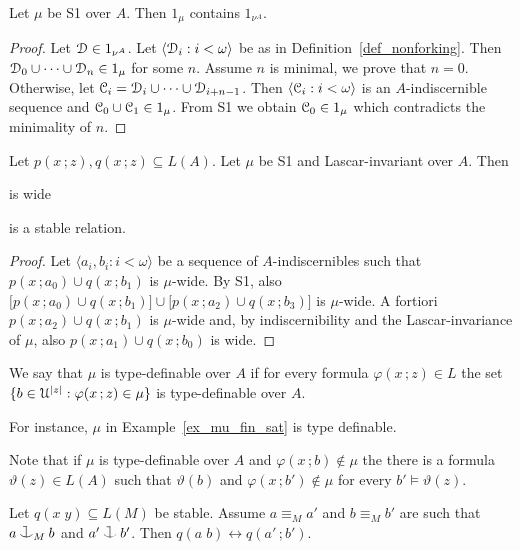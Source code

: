 \documentclass{amsproc}
\def\cnonfork{\mathbin{\raise1.8ex\rlap{\kern0.6ex\rule{0.6ex}{0.1ex}}\rlap{\kern1.1ex\rule{0.1ex}{1.9ex}}\raise-0.3ex\hbox{$\smile$} } }
\begin{document}
\begin{fact}
  Let $\mu$ be S1 over $A$.
  Then $1_\mu$ contains $1_{\nu^A}$.
\end{fact}

\begin{proof}
  Let $\EuScript D\in 1_{\nu^A}$. 
  Let $\langle \EuScript D_i:i<\omega\rangle$ be as in Definition~\ref{def_nonforking}.
  Then $\EuScript D_0\cup\dots\cup\EuScript D_n\in1_\mu$ for some $n$.
  Assume $n$ is minimal, we prove that $n=0$.
  Otherwise, let $\EuScript C_i=\EuScript D_i\cup\dots\cup\EuScript D_{i+n-1}$.
  Then $\langle \EuScript C_i:i<\omega\rangle$ is an $A$-indiscernible sequence and $\EuScript C_0\cup\EuScript C_1\in1_\mu$.
  From S1 we obtain $\EuScript C_0\in1_\mu$ which contradicts the minimality of $n$.
\end{proof}

\begin{theorem}
  Let $p(x\,;z), q(x\,;z)\subseteq L(A)$.
  Let $\mu$ be S1 and Lascar-invariant over $A$.
  Then 

   is wide

  is a stable relation.
\end{theorem}

\begin{proof}
  Let $\langle a_i,b_i: i<\omega\rangle$ be a sequence of $A$-indiscernibles such that $p(x\,;a_0)\cup q(x\,;b_1)$ is $\mu$-wide.
  By S1, also $\big[p(x\,;a_0)\cup q(x\,;b_1)\big]\cup\big[p(x\,;a_2)\cup q(x\,;b_3)\big]$ is $\mu$-wide.
  A fortiori $p(x\,;a_2)\cup q(x\,;b_1)$ is $\mu$-wide and, by indiscernibility and the Lascar-invariance of $\mu$, also $p(x\,;a_1)\cup q(x\,;b_0)$ is wide.
\end{proof}

\begin{definition}
  We say that $\mu$ is type-definable over $A$ if for every formula $\varphi(x\,;z)\in L$ the set $\{b\in\EuScript U^{|z|} : \varphi(x\,;z)\in\mu\}$ is type-definable over $A$.
\end{definition}

For instance, $\mu$ in Example~\ref{ex_mu_fin_sat} is type definable.

Note that if $\mu$ is type-definable over $A$ and $\varphi(x\,;b)\notin\mu$ the there is a formula $\vartheta(z)\in L(A)$ such that $\vartheta(b)$ and $\varphi(x\,;b')\notin\mu$ for every $b'\models\vartheta(z)$.

\begin{fact}
  Let $q(x\;y)\subseteq L(M)$ be stable.
  Assume $a\equiv_M a' $ and $b\equiv_Mb'$ are such that $a\cnonfork_M b$ and $a'\cnonfork b'$.
  Then $q(a\;b)\leftrightarrow q(a'\,;b')$.
\end{fact}
\end{document}
